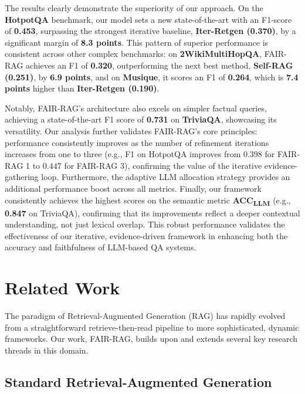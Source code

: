 \documentclass[11pt]{article}
\begin{document}
The results clearly demonstrate the superiority of our approach. On the \textbf{HotpotQA} benchmark, our model sets a new state-of-the-art with an F1-score of \textbf{0.453}, surpassing the strongest iterative baseline, \textbf{Iter-Retgen (0.370)}, by a significant margin of \textbf{8.3 points}. This pattern of superior performance is consistent across other complex benchmarks: on \textbf{2WikiMultiHopQA}, FAIR-RAG achieves an F1 of \textbf{0.320}, outperforming the next best method, \textbf{Self-RAG (0.251)}, by \textbf{6.9 points}, and on \textbf{Musique}, it scores an F1 of \textbf{0.264}, which is \textbf{7.4 points} higher than \textbf{Iter-Retgen (0.190)}.

Notably, FAIR-RAG's architecture also excels on simpler factual queries, achieving a state-of-the-art F1 score of \textbf{0.731} on \textbf{TriviaQA}, showcasing its versatility. Our analysis further validates FAIR-RAG's core principles: performance consistently improves as the number of refinement iterations increases from one to three (e.g., F1 on HotpotQA improves from 0.398 for FAIR-RAG 1 to 0.447 for FAIR-RAG 3), confirming the value of the iterative evidence-gathering loop. Furthermore, the adaptive LLM allocation strategy provides an additional performance boost across all metrics. Finally, our framework consistently achieves the highest scores on the semantic metric \textbf{ACC\textsubscript{LLM}} (e.g., \textbf{0.847} on TriviaQA), confirming that its improvements reflect a deeper contextual understanding, not just lexical overlap. This robust performance validates the effectiveness of our iterative, evidence-driven framework in enhancing both the accuracy and faithfulness of LLM-based QA systems.

\section{Related Work}

The paradigm of Retrieval-Augmented Generation (RAG) has rapidly evolved from a straightforward retrieve-then-read pipeline to more sophisticated, dynamic frameworks. Our work, FAIR-RAG, builds upon and extends several key research threads in this domain.

\subsection{Standard Retrieval-Augmented Generation}
\end{document}
